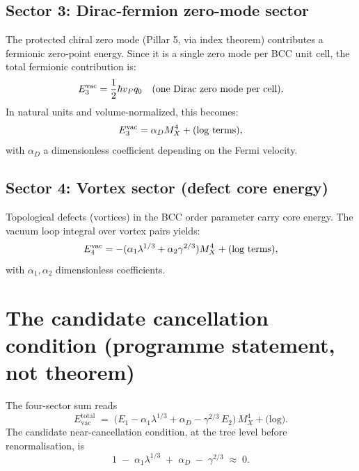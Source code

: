 \subsection{Sector 3: Dirac-fermion zero-mode sector}

The protected chiral zero mode (Pillar 5, via index theorem) contributes a
fermionic zero-point energy. Since it is a single zero mode per BCC unit cell,
the total fermionic contribution is:
\begin{equation}
E_3^{\rm vac} = \frac{1}{2} \hbar v_F q_0 \quad \text{(one Dirac zero mode per cell)}.
\end{equation}
In natural units and volume-normalized, this becomes:
\begin{equation}
E_3^{\rm vac} = \alpha_D M_X^4 + \text{(log terms)},
\end{equation}
with $\alpha_D$ a dimensionless coefficient depending on the Fermi velocity.

\subsection{Sector 4: Vortex sector (defect core energy)}

Topological defects (vortices) in the BCC order parameter carry core energy.
The vacuum loop integral over vortex pairs yields:
\begin{equation}
E_4^{\rm vac} = -(\alpha_1 \lambda^{1/3} + \alpha_2 \gamma^{2/3}) M_X^4 + \text{(log terms)},
\end{equation}
with $\alpha_1, \alpha_2$ dimensionless coefficients.

\section{The candidate cancellation condition (programme statement,
not theorem)}\label{sec:cancellation}

The four-sector sum reads
\begin{equation}\label{eq:Etotal}
  E_{\mathrm{vac}}^{\mathrm{total}}
  \;=\; \big(E_1
    - \alpha_1 \lambda^{1/3}
    + \alpha_D
    - \gamma^{2/3}\,E_2\big)\,M_X^4
  + \text{(log)}.
\end{equation}
The candidate near-cancellation condition, at the tree level before
renormalisation, is
\begin{equation}\label{eq:cancel-cond}
  1 \;-\; \alpha_1 \lambda^{1/3} \;+\; \alpha_D \;-\; \gamma^{2/3}
  \;\approx\; 0.
\end{equation}

